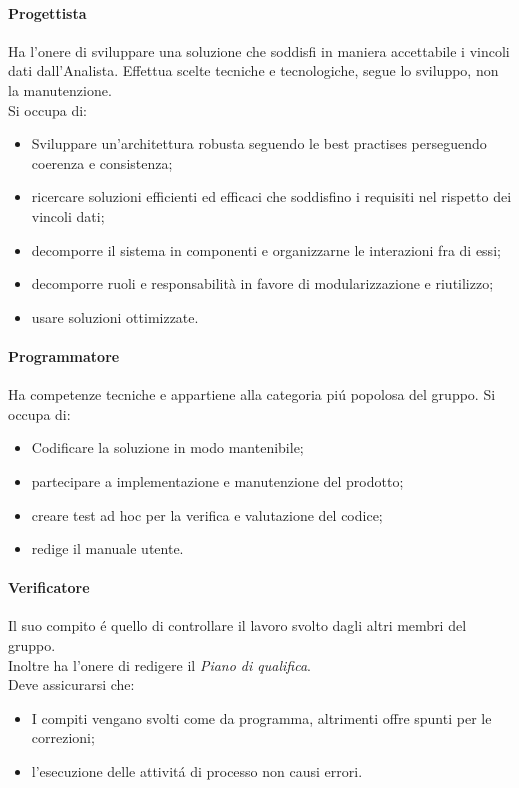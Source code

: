         \paragraph{Progettista}
            Ha l'onere di sviluppare una soluzione che soddisfi in maniera accettabile i vincoli dati dall'Analista.
            Effettua scelte tecniche e tecnologiche, segue lo sviluppo, non la manutenzione. \\
            Si occupa di:
            \begin{itemize}
                \item Sviluppare un'architettura robusta seguendo le best practises perseguendo coerenza e consistenza;
                \item ricercare soluzioni efficienti ed efficaci che soddisfino i requisiti nel rispetto dei vincoli dati;
                \item decomporre il sistema in componenti e organizzarne le interazioni fra di essi;
                \item decomporre ruoli e responsabilità in favore di modularizzazione e riutilizzo;
                \item usare soluzioni ottimizzate.
            \end{itemize}
        \paragraph{Programmatore}
            Ha competenze tecniche e appartiene alla categoria pi\'u popolosa del gruppo.
            Si occupa di:
            \begin{itemize}
                \item Codificare la soluzione in modo mantenibile;
                \item partecipare a implementazione e manutenzione del prodotto;
                \item creare test ad hoc per la verifica e valutazione del codice;
                \item redige il manuale utente.
            \end{itemize}
        \paragraph{Verificatore}
            Il suo compito \'e quello di controllare il lavoro svolto dagli altri membri del gruppo. \\
            Inoltre ha l'onere di redigere il \emph{Piano di qualifica}. \\
            Deve assicurarsi che:
            \begin{itemize}
                \item I compiti vengano svolti come da programma, altrimenti offre spunti per le correzioni;
                \item l'esecuzione delle attivit\'a di processo non causi errori.
            \end{itemize}
